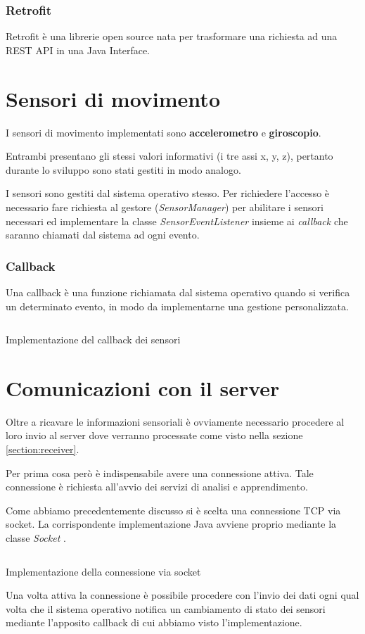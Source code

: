 \subsubsection{Retrofit}
Retrofit \cite{retrofit} è una librerie open source nata per trasformare una richiesta ad una REST API 
in una Java Interface.


\newpage
\section{Sensori di movimento}
I sensori di movimento implementati sono \textbf{accelerometro} e \textbf{giroscopio}.

Entrambi presentano gli stessi valori informativi (i tre assi x, y, z), pertanto durante lo sviluppo sono stati gestiti in modo analogo.

I sensori sono gestiti dal sistema operativo stesso. Per richiedere l'accesso è necessario fare richiesta al gestore (\textit{SensorManager}) 
per abilitare i sensori necessari ed implementare la classe \textit{SensorEventListener} \cite{sensor}
insieme ai \textit{callback} che saranno chiamati dal sistema ad ogni evento.
\subsubsection{Callback}
Una callback è una funzione richiamata dal sistema operativo quando si verifica un determinato evento, in modo da implementarne 
una gestione personalizzata.

\begin{listing}[H] 
    \inputminted[frame=single,framesep=10pt]{java}{snippets/app/sensors.java}
    \caption{Implementazione del callback dei sensori}
    \label{listing:sensor-event-callback}
\end{listing}



\newpage
\section{Comunicazioni con il server}
Oltre a ricavare le informazioni sensoriali è ovviamente necessario procedere al loro invio al server  
dove verranno processate come visto nella sezione \ref{section:receiver}.

Per prima cosa però è indispensabile avere una connessione attiva. Tale connessione è richiesta all'avvio dei servizi di 
analisi e apprendimento.

Come abbiamo precedentemente discusso si è scelta una connessione TCP via socket. La corrispondente implementazione Java
avviene proprio mediante la classe \textit{Socket} \cite{socket}.
\begin{listing}[H] 
    \inputminted[frame=single,framesep=10pt]{java}{snippets/app/server.java}
    \caption{Implementazione della connessione via socket}
\end{listing}
Una volta attiva la connessione è possibile procedere con l'invio dei dati ogni qual volta che il sistema 
operativo notifica un cambiamento di stato dei sensori mediante l'apposito callback 
di cui abbiamo visto l'implementazione.